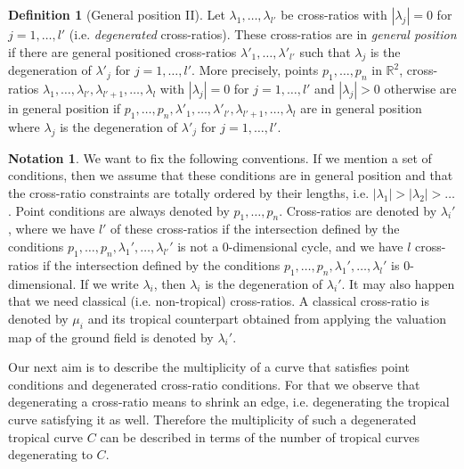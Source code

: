 \documentclass[11pt,reqno,a4]{amsart}
\theoremstyle{dotless}
\theoremstyle{definition}
\newtheorem{definition}[corollary]{Definition}
\newtheorem{notation}[corollary]{Notation}
\begin{document}
\begin{definition}[General position II]\label{definition:general_position_II}
Let $\lambda_1,\dots,\lambda_{l'}$ be cross-ratios with $|\lambda_j|=0$ for $j=1,\dots,l'$ (i.e. \textit{degenerated} cross-ratios). These cross-ratios are in \textit{general position} if there are general positioned cross-ratios $\lambda'_1,\dots,\lambda'_{l'}$ such that $\lambda_j$ is the degeneration of $\lambda'_j$ for $j=1,\dots,l'$. More precisely, points $p_1,\dots,p_n$ in $\mathbb{R}^2$, cross-ratios $\lambda_1,\dots,\lambda_{l'},\lambda_{l'+1},\dots,\lambda_l$ with $|\lambda_j|=0$ for $j=1,\dots,l'$ and $|\lambda_j|>0$ otherwise are in general position if $p_1,\dots,p_n,\lambda'_1,\dots,\lambda'_{l'},\lambda_{l'+1},\dots,\lambda_l$ are in general position where $\lambda_j$ is the degeneration of $\lambda'_j$ for $j=1,\dots,l'$.
\end{definition}

\begin{notation}\label{notation}
We want to fix the following conventions. If we mention a set of conditions, then we assume that these conditions are in general position and that the cross-ratio constraints are totally ordered by their lengths, i.e. $|\lambda_1|>|\lambda_2|>\dots$. Point conditions are always denoted by $p_1,\dots,p_n$. Cross-ratios are denoted by $\lambda_i'$, where we have $l'$ of these cross-ratios if the intersection defined by the conditions $p_1,\dots,p_n,\lambda_1',\dots,\lambda_{l'}'$ is not a $0$-dimensional cycle, and we have $l$ cross-ratios if the intersection defined by the conditions $p_1,\dots,p_n,\lambda_1',\dots,\lambda_{l}'$ is $0$-dimensional. If we write $\lambda_i$, then $\lambda_i$ is the degeneration of $\lambda_i'$. It may also happen that we need classical (i.e. non-tropical) cross-ratios. A classical cross-ratio is denoted by $\mu_i$ and its tropical counterpart obtained from applying the valuation map of the ground field is denoted by $\lambda_i'$.
\end{notation}

Our next aim is to describe the multiplicity of a curve that satisfies point conditions and degenerated cross-ratio conditions. For that we observe that degenerating a cross-ratio means to shrink an edge, i.e. degenerating the tropical curve satisfying it as well. Therefore the multiplicity of such a degenerated tropical curve $C$ can be described in terms of the number of tropical curves degenerating to $C$.
\end{document}
